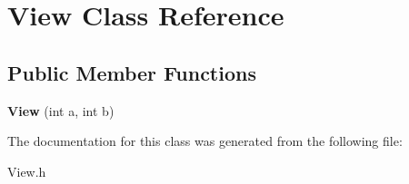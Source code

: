 \hypertarget{class_view}{}\section{View Class Reference}
\label{class_view}
\subsection*{Public Member Functions}
\begin{DoxyCompactItemize}
\item 
\mbox{\label{class_view_ad4a65c40778af575bce0c5b7faab666c}} 
{\bfseries View} (int a, int b)
\end{DoxyCompactItemize}


The documentation for this class was generated from the following file\+:\begin{DoxyCompactItemize}
\item 
View.\+h\end{DoxyCompactItemize}
